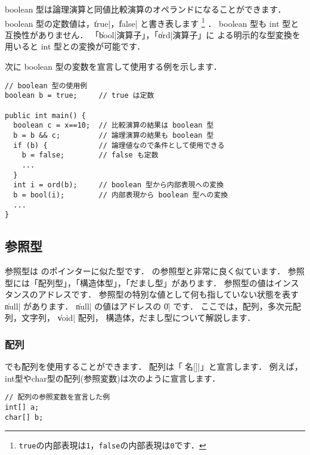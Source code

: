 boolean 型は論理演算と同値比較演算のオペランドになることができます．
boolean 型の定数値は，\|true|，\|false| と書き表します
\footnote{{\tt true}の内部表現は{\tt 1}，{\tt false}の内部表現は{\tt 0}です．}
．
boolean 型も int 型と互換性がありません．
「\|bool|演算子」，「\|ord|演算子」に
よる明示的な型変換を用いると int 型との変換が可能です．

次に boolean 型の変数を宣言して使用する例を示します．

\begin{mylist}
\begin{verbatim}
// boolean 型の使用例
boolean b = true;     // true は定数

public int main() {
  boolean c = x==10;  // 比較演算の結果は boolean 型
  b = b && c;         // 論理演算の結果も boolean 型
  if (b) {            // 論理値なので条件として使用できる
    b = false;        // false も定数
    ...
  }
  int i = ord(b);     // boolean 型から内部表現への変換
  b = bool(i);        // 内部表現から boolean 型への変換
  ...
}
\end{verbatim}
\end{mylist}

\subsection{参照型}
\label{chap3:ref}

参照型は \cl のポインターに似た型です．
\javal の参照型と非常に良く似ています．
参照型には「配列型」，「構造体型」，「だまし型」があります．
参照型の値はインスタンスのアドレスです．
参照型の特別な値として何も指していない状態を表す \|null| があります．
\|null| の値はアドレスの \|0| です．
ここでは，配列，多次元配列，文字列， \|void| 配列，
構造体，だまし型について解説します．

\subsubsection{配列}
\label{chap3:array}
\cmml でも配列を使用することができます．
配列は「\|型名[]|」と宣言します．
例えば，int型やchar型の配列(参照変数)は次のように宣言します．

\begin{mylist}
\begin{verbatim}
// 配列の参照変数を宣言した例
int[] a;
char[] b;
\end{verbatim}
\end{mylist}


